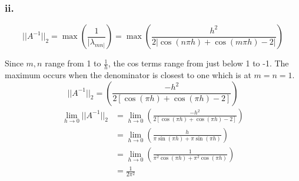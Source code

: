 \documentclass{article}
\begin{document}
\subsubsection*{ii.}
\begin{equation}
||A^{-1}||_2=\max\left(\frac{1}{|\lambda_{mn|}}\right)=\max\left(\frac{h^2}{2|\cos(n\pi h)+\cos(m\pi h)-2|}\right)
\end{equation}

Since $m,n$ range from 1 to $\frac{1}{h}$, the cos terms range from just below 1 to -1. The maximum occurs when the denominator is closest to one which is at $m=n=1$.
\begin{equation}
||A^{-1}||_2=\left(\frac{-h^2}{2[\cos(\pi h)+\cos(\pi h)-2]}\right)
\end{equation}
\begin{align}
\lim_{h\to0}||A^{-1}||_2&=\lim_{h\to0}\left(\frac{-h^2}{2[\cos(\pi h)+\cos(\pi h)-2]}\right) \nonumber\\
&=\lim_{h\to0}\left(\frac{h}{\pi\sin(\pi h)+\pi\sin(\pi h)}\right) \nonumber\\
&=\lim_{h\to0}\left(\frac{1}{\pi^2\cos(\pi h)+\pi^2\cos(\pi h)}\right) \nonumber\\
&=\frac{1}{2\pi^2}
\end{align}
\end{document}
